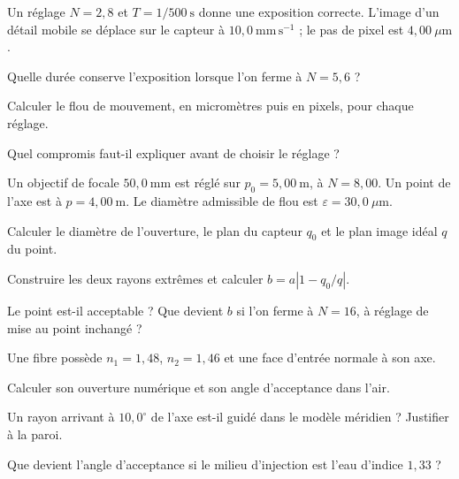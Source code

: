 Un réglage $N=2{,}8$ et $T=1/500\ \mathrm{s}$ donne une exposition correcte. L'image d'un détail mobile se déplace sur le capteur à $10{,}0\ \mathrm{mm\,s^{-1}}$ ; le pas de pixel est $4{,}00\ \mu\mathrm{m}$.
\begin{questions}
\item Quelle durée conserve l'exposition lorsque l'on ferme à $N=5{,}6$ ?
\item Calculer le flou de mouvement, en micromètres puis en pixels, pour chaque réglage.
\item Quel compromis faut-il expliquer avant de choisir le réglage ?
\end{questions}
Un objectif de focale $50{,}0\ \mathrm{mm}$ est réglé sur $p_0=5{,}00\ \mathrm{m}$, à $N=8{,}00$. Un point de l'axe est à $p=4{,}00\ \mathrm{m}$. Le diamètre admissible de flou est $\varepsilon=30{,}0\ \mu\mathrm{m}$.
\begin{questions}
\item Calculer le diamètre de l'ouverture, le plan du capteur $q_0$ et le plan image idéal $q$ du point.
\item Construire les deux rayons extrêmes et calculer $b=a|1-q_0/q|$.
\item Le point est-il acceptable ? Que devient $b$ si l'on ferme à $N=16$, à réglage de mise au point inchangé ?
\end{questions}
Une fibre possède $n_1=1{,}48$, $n_2=1{,}46$ et une face d'entrée normale à son axe.
\begin{questions}
\item Calculer son ouverture numérique et son angle d'acceptance dans l'air.
\item Un rayon arrivant à $10{,}0^\circ$ de l'axe est-il guidé dans le modèle méridien ? Justifier à la paroi.
\item Que devient l'angle d'acceptance si le milieu d'injection est l'eau d'indice $1{,}33$ ?
\end{questions}

